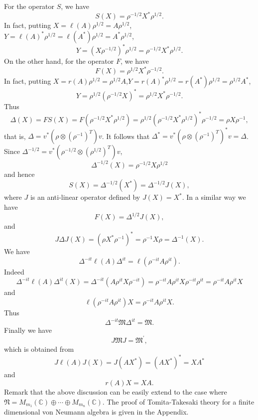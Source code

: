 For the operator $S$, we have 
	$$
    S(X)=\rho^{-1/2}X^*\rho^{1/2}.
 	$$
	In fact, putting $X=\ell(A)\rho^{1/2}=A\rho^{1/2}$,$Y=\ell(A)^\ast\rho^{1/2}=\ell(A^\ast)\rho^{1/2}=A^\ast \rho^{1/2}$,
	$$
    Y=(X\rho^{-1/2})^\ast \rho^{1/2}=\rho^{-1/2}X^\ast\rho^{1/2}.
  $$
On the other hand, for the operator $F$, we have
$$
F(X)=\rho^{1/2}X^\ast \rho^{-1/2}.
$$
In fact, putting $X=r(A)\rho^{1/2}=\rho^{1/2}A$,$Y=r(A)^\ast\rho^{1/2}=r(A^\ast)\rho^{1/2}= \rho^{1/2}A^\ast$,
	$$
    Y= \rho^{1/2}(\rho^{-1/2}X)^\ast=\rho^{1/2}X^\ast\rho^{-1/2}.
  $$
Thus
$$
\Delta(X)=FS(X)=F(\rho^{-1/2}X^*\rho^{1/2})=\rho^{1/2}(\rho^{-1/2}X^*\rho^{1/2})^\ast \rho^{-1/2}=\rho X \rho^{-1},
$$
that is, $\Delta=v^\ast(\rho \otimes ({\rho}^{-1})^T) v$.
It follows that $\Delta^\ast=v^\ast (\rho\otimes({\rho}^{-1})^T)^\ast v=\Delta$.
Since $\Delta^{-1/2}=v^\ast(\rho^{-1/2}\otimes ({\rho}^{1/2})^T) v$, 
$$
\Delta^{-1/2}(X)=\rho^{-1/2}X\rho^{1/2}
$$
and hence 
$$
S(X)=\Delta^{-1/2}(X^\ast)=\Delta^{-1/2}J(X),
$$
where $J$ is an anti-linear operator defined by $J(X)=X^\ast$.
In a similar way we have
$$
F(X)=\Delta^{1/2}J(X),
$$
and
$$
J\Delta J(X)=(\rho X^\ast \rho^{-1})^\ast=\rho^{-1}X\rho=\Delta^{-1}(X).
$$
We have 
$$
\Delta^{-it}\ell(A)\Delta^{it}=\ell(\rho^{-it}A\rho^{it}).
$$
Indeed $$\Delta^{-it}\ell(A)\Delta^{it}(X)=\Delta^{-it}(A\rho^{it}X\rho^{-it})=\rho^{-it}A\rho^{it}X\rho^{-it}\rho^{it}=\rho^{-it}A\rho^{it}X$$
and 
$$
\ell(\rho^{-it}A\rho^{it})X=\rho^{-it}A\rho^{it}X.
$$
Thus
$$
\Delta^{-it}\mathfrak{M}\Delta^{it}=\mathfrak{M}.
$$
     Finally we have 
       $$
          J\mathfrak{M}J=\mathfrak{M}^{\prime},
       $$
			 which is obtained from
			 $$
J\ell(A)J(X)=J(AX^\ast)=(AX^\ast)^\ast=XA^\ast
			 $$
			 and
			 $$
r(A)X=XA.
			 $$
Remark that the above discussion can be easily extend to the case where 
$\mathfrak{N}=M_{m_1}(\mathbb{C})\oplus \cdots \oplus M_{m_n}(\mathbb{C})$.
The proof of Tomita-Takesaki theory for a finite dimensional von Neumann algebra is given in the Appendix.
